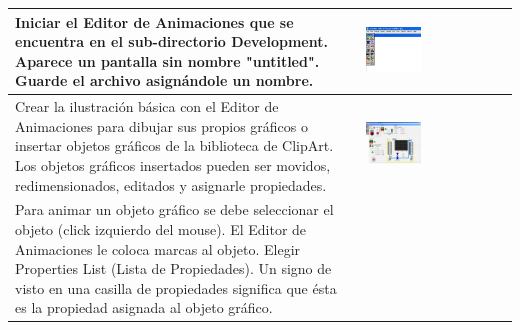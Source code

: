 \begin{table}[H]
\centering
\renewcommand*{\arraystretch}{0.01}
\begin{tabular}{*{2}{m{}}}
   \hline
	Iniciar el Editor de Animaciones que se encuentra en el sub-directorio 
	Development. Aparece un pantalla sin nombre "untitled". Guarde el 
archivo 	asignándole un nombre.
	&\begin{center}
	 \includegraphics[width=0.4\textwidth]
	{Cap5-SCADA/images/animEdit.jpeg}
	\end{center}\\
   \hline
	Crear la ilustración básica con el Editor de Animaciones para  
	dibujar sus propios gráficos o insertar objetos gráficos de 
	la biblioteca de ClipArt. Los objetos gráficos insertados pueden ser 
	movidos, redimensionados, editados y asignarle propiedades.
	&\begin{center}
	   \includegraphics[width=0.4\textwidth]
	{Cap5-SCADA/images/animEdit1.jpeg}
	\end{center}\\
   \hline
	  Para animar un objeto gráfico se debe seleccionar 
	  el objeto (click izquierdo del mouse). El Editor de Animaciones le 
	  coloca marcas al objeto. Elegir Properties List (Lista de 
	  Propiedades). Un signo de visto en una casilla de propiedades 
	  significa que ésta es la propiedad asignada al objeto gráfico. 
	&\begin{center}
	   \includegraphics[width=0.4\textwidth]

\end{center}
\end{tabular}
\end{table}
